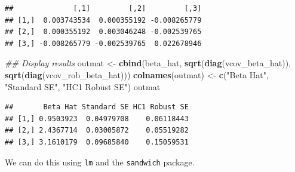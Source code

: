 \documentclass[]{article}
\newenvironment{Shaded}{\begin{snugshade}}{\end{snugshade}}
\newcommand{\CommentTok}[1]{\textcolor[rgb]{0.56,0.35,0.01}{\textit{#1}}}
\newcommand{\KeywordTok}[1]{\textcolor[rgb]{0.13,0.29,0.53}{\textbf{#1}}}
\newcommand{\NormalTok}[1]{#1}
\newcommand{\StringTok}[1]{\textcolor[rgb]{0.31,0.60,0.02}{#1}}
\begin{document}
\begin{verbatim}
##              [,1]         [,2]         [,3]
## [1,]  0.003743534  0.000355192 -0.008265779
## [2,]  0.000355192  0.003046248 -0.002539765
## [3,] -0.008265779 -0.002539765  0.022678946
\end{verbatim}

\begin{Shaded}
\begin{Highlighting}[]
\CommentTok{## Display results}
\NormalTok{outmat <-}\StringTok{ }\KeywordTok{cbind}\NormalTok{(beta_hat, }\KeywordTok{sqrt}\NormalTok{(}\KeywordTok{diag}\NormalTok{(vcov_beta_hat)),  }\KeywordTok{sqrt}\NormalTok{(}\KeywordTok{diag}\NormalTok{(vcov_rob_beta_hat)))}
\KeywordTok{colnames}\NormalTok{(outmat) <-}\StringTok{ }\KeywordTok{c}\NormalTok{(}\StringTok{"Beta Hat"}\NormalTok{, }\StringTok{"Standard SE"}\NormalTok{, }\StringTok{"HC1 Robust SE"}\NormalTok{)}
\NormalTok{outmat}
\end{Highlighting}
\end{Shaded}

\begin{verbatim}
##       Beta Hat Standard SE HC1 Robust SE
## [1,] 0.9503923  0.04979708    0.06118443
## [2,] 2.4367714  0.03005872    0.05519282
## [3,] 3.1610179  0.09685840    0.15059531
\end{verbatim}

We can do this using \texttt{lm} and the \texttt{sandwich} package.
\end{document}
